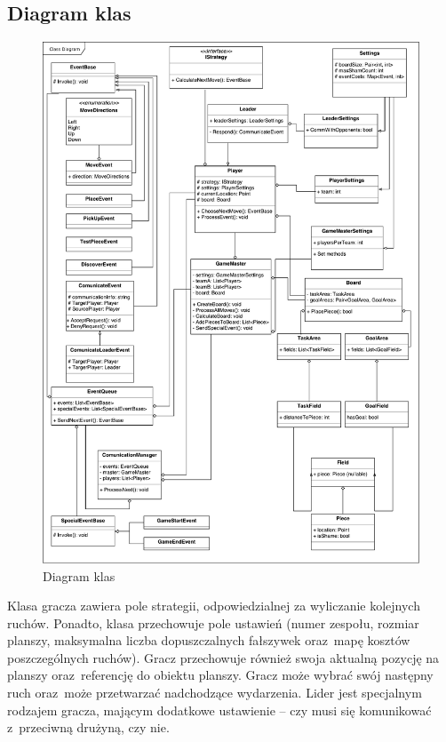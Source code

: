 \documentclass[a4paper]{article}
\begin{document}
\subsection{Diagram klas}
\newpage
\begin{figure}[H]
\caption{Diagram klas}
\centering
\includegraphics[scale=0.47]{diagram_klas.pdf}
\end{figure}

Klasa gracza zawiera pole strategii, odpowiedzialnej za wyliczanie kolejnych ruchów.
Ponadto, klasa przechowuje pole ustawień (numer zespołu, rozmiar planszy, maksymalna liczba dopuszczalnych fałszywek oraz~mapę kosztów poszczególnych ruchów).
Gracz przechowuje również swoja aktualną pozycję na planszy oraz~referencję do obiektu planszy.
Gracz może wybrać swój następny ruch oraz~może przetwarzać nadchodzące wydarzenia.
Lider jest specjalnym rodzajem gracza, mającym dodatkowe ustawienie -- czy musi się komunikować z~przeciwną drużyną, czy nie.
\end{document}
